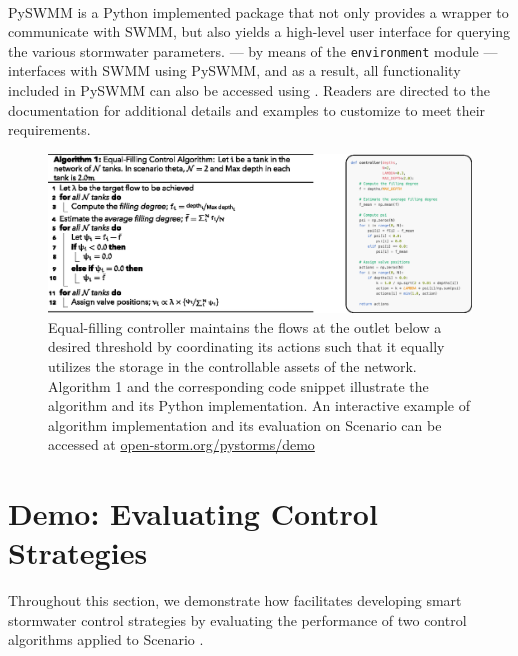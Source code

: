 \

PySWMM is a Python implemented package that not only provides a wrapper to communicate with SWMM, but also yields a high-level user interface for querying the various stormwater parameters. \pystorms --- by means of the \texttt{environment} module --- interfaces with SWMM using PySWMM, and as a result, all functionality included in PySWMM can also be accessed using \pystormsNOSPACE. Readers are directed to the documentation for additional details and examples to customize \pystorms to meet their requirements. 
%
%
%
\begin{figure}
    \centering
    \includegraphics[width=\linewidth]{gfx/Chapter-5/algo.eps}
    \caption{Equal-filling controller maintains the flows at the outlet below a desired threshold by coordinating its actions such that it equally utilizes the storage in the controllable assets of the network.
    Algorithm 1 and the corresponding code snippet illustrate the algorithm and its Python implementation. 
    An interactive example of algorithm implementation and its evaluation on Scenario  can be accessed at \href{https://colab.research.google.com/drive/1KZmqE7UJxKCzBdDvN8A0uZ_3lzSgHmNP}{open-storm.org/pystorms/demo}}
    \label{fig:eqf}
\end{figure}
%
%
%
%
%
%
%
%
%
%
%
%
%
%
%
\section{Demo: Evaluating Control Strategies}
\label{sec:evaluatingcontrolstrategies}
%
%
%
Throughout this section, we demonstrate how \pystorms facilitates developing smart stormwater control strategies by evaluating the performance of two control algorithms applied to Scenario .

